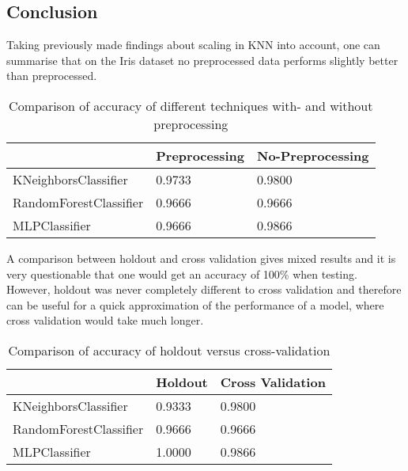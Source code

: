 
\subsection{Conclusion}

Taking previously made findings about scaling in KNN into account, one can summarise that on the Iris dataset no preprocessed data performs slightly better than preprocessed.

\begin{table}[h]
\begin{center}
\begin{tabular}{|l|l|l|}
\hline
                       & Preprocessing & No-Preprocessing \\ \hline
KNeighborsClassifier   & 0.9733        & 0.9800           \\ \hline
RandomForestClassifier & 0.9666        & 0.9666           \\ \hline
MLPClassifier          & 0.9666        & 0.9866           \\ \hline
\end{tabular}
\caption{Comparison of accuracy of different techniques with- and without preprocessing}
\end{center}
\end{table}

A comparison between holdout and cross validation gives mixed results and it is very questionable that one would get an accuracy of 100\% when testing. However, holdout was never completely different to cross validation and therefore can be useful for a quick approximation of the performance of a model, where cross validation would take much longer.

\begin{table}[h]
\begin{center}
\begin{tabular}{|l|l|l|}
\hline
                       & Holdout & Cross Validation \\ \hline
KNeighborsClassifier   & 0.9333  & 0.9800           \\ \hline
RandomForestClassifier & 0.9666  & 0.9666           \\ \hline
MLPClassifier          & 1.0000  & 0.9866           \\ \hline
\end{tabular}
\caption{Comparison of accuracy of holdout versus cross-validation}
\end{center}
\end{table}

